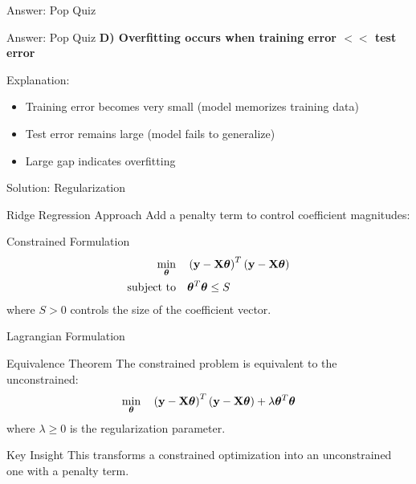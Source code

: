 \documentclass{beamer}
\begin{document}
\begin{frame}{Answer: Pop Quiz \thepopquiz}
\begin{popquizbox}{Answer: Pop Quiz \thepopquiz}
\textbf{D) Overfitting occurs when training error $<<$ test error}

\vspace{0.3cm}
Explanation:
\begin{itemize}
\item Training error becomes very small (model memorizes training data)
\item Test error remains large (model fails to generalize)  
\item Large gap indicates overfitting
\end{itemize}
\end{popquizbox}
\end{frame}
\begin{frame}{Solution: Regularization}
\begin{theorembox}{Ridge Regression Approach}
Add a penalty term to control coefficient magnitudes:
\end{theorembox}
\pause

\begin{definitionbox}{Constrained Formulation}
\begin{align*}
\min_{\boldsymbol{\theta}} & \quad \left(\mathbf{y}-\mathbf{X}\boldsymbol{\theta}\right)^T\left(\mathbf{y}-\mathbf{X}\boldsymbol{\theta}\right) \\
\text{subject to} & \quad \boldsymbol{\theta}^T\boldsymbol{\theta} \leq S
\end{align*}
where $S > 0$ controls the size of the coefficient vector.
\end{definitionbox}
\end{frame}

\begin{frame}{Lagrangian Formulation}
\begin{theorembox}{Equivalence Theorem}
The constrained problem is equivalent to the unconstrained:
$$\min_{\boldsymbol{\theta}} \quad \left(\mathbf{y}-\mathbf{X}\boldsymbol{\theta}\right)^T\left(\mathbf{y}-\mathbf{X}\boldsymbol{\theta}\right) + \lambda \boldsymbol{\theta}^T\boldsymbol{\theta}$$
where $\lambda \geq 0$ is the regularization parameter.
\end{theorembox}
\pause

\begin{keypointsbox}{Key Insight}
This transforms a constrained optimization into an unconstrained one with a penalty term.
\end{keypointsbox}
\end{frame}
\end{document}
